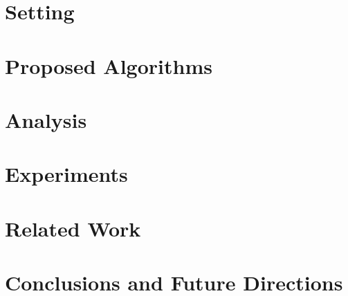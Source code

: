 \documentclass[letterpaper]{article} %
\newcommand{\todob}[2][]{\todo[color=cyan!20,size=\tiny,inline,#1]{B: #2}} %
\begin{document}
\section{Setting}
\label{probdef}



\section{Proposed Algorithms}
\label{algo}


\section{Analysis}
\label{analysis}


\section{Experiments}
\label{expt}


\section{Related Work}
\label{related}


\section{Conclusions and Future Directions}
\label{conclusions}




\newpage




\appendix

\end{document}
